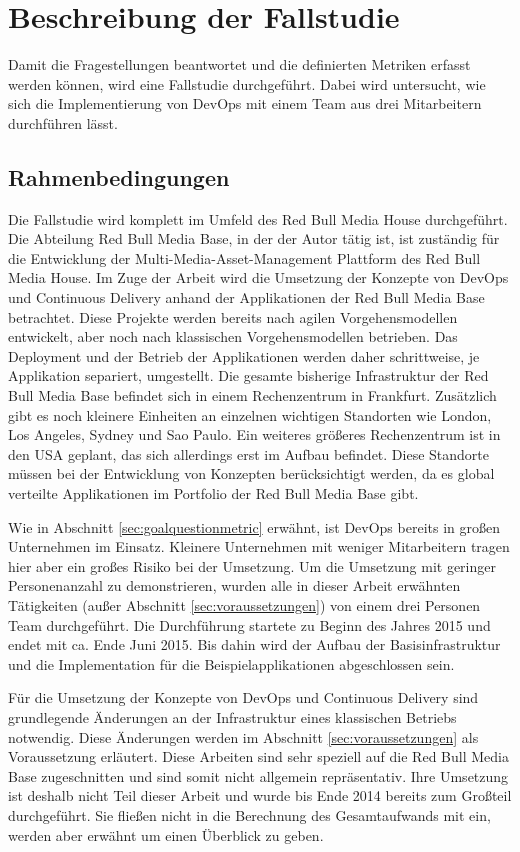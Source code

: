 \section{Beschreibung der Fallstudie}
\label{sec:fallstudie}
Damit die Fragestellungen beantwortet und die definierten Metriken erfasst werden können, wird eine Fallstudie durchgeführt. Dabei wird untersucht, wie sich die Implementierung von DevOps mit einem Team aus drei Mitarbeitern durchführen lässt.

\subsection{Rahmenbedingungen}
\label{sec:rahmenbedingungen}
Die Fallstudie wird komplett im Umfeld des Red Bull Media House durchgeführt. Die Abteilung Red Bull Media Base, in der der Autor tätig ist, ist zuständig für die Entwicklung der Multi-Media-Asset-Management Plattform des Red Bull Media House. Im Zuge der Arbeit wird die Umsetzung der Konzepte von DevOps und Continuous Delivery anhand der Applikationen der Red Bull Media Base betrachtet. Diese Projekte werden bereits nach agilen Vorgehensmodellen entwickelt, aber noch nach klassischen Vorgehensmodellen betrieben. Das Deployment und der Betrieb der Applikationen werden daher schrittweise, je Applikation separiert, umgestellt. Die gesamte bisherige Infrastruktur der Red Bull Media Base befindet sich in einem Rechenzentrum in Frankfurt. Zusätzlich gibt es noch kleinere Einheiten an einzelnen wichtigen Standorten wie London, Los Angeles, Sydney und Sao Paulo. Ein weiteres größeres Rechenzentrum ist in den USA geplant, das sich allerdings erst im Aufbau befindet. Diese Standorte müssen bei der Entwicklung von Konzepten berücksichtigt werden, da es global verteilte Applikationen im Portfolio der Red Bull Media Base gibt.

Wie in Abschnitt \ref{sec:goalquestionmetric} erwähnt, ist DevOps bereits in großen Unternehmen im Einsatz. Kleinere Unternehmen mit weniger Mitarbeitern tragen hier aber ein großes Risiko bei der Umsetzung. Um die Umsetzung mit geringer Personenanzahl zu demonstrieren, wurden alle in dieser Arbeit erwähnten Tätigkeiten (außer Abschnitt \ref{sec:voraussetzungen}) von einem drei Personen Team durchgeführt. Die Durchführung startete zu Beginn des Jahres 2015 und endet mit ca. Ende Juni 2015. Bis dahin wird der Aufbau der Basisinfrastruktur und die Implementation für die Beispielapplikationen abgeschlossen sein.

Für die Umsetzung der Konzepte von DevOps und Continuous Delivery sind grundlegende Änderungen an der Infrastruktur eines klassischen Betriebs notwendig. Diese Änderungen werden im Abschnitt \ref{sec:voraussetzungen} als Voraussetzung erläutert. Diese Arbeiten sind sehr speziell auf die Red Bull Media Base zugeschnitten und sind somit nicht allgemein repräsentativ. Ihre Umsetzung ist deshalb nicht Teil dieser Arbeit und wurde bis Ende 2014 bereits zum Großteil durchgeführt. Sie fließen nicht in die Berechnung des Gesamtaufwands mit ein, werden aber erwähnt um einen Überblick zu geben.

